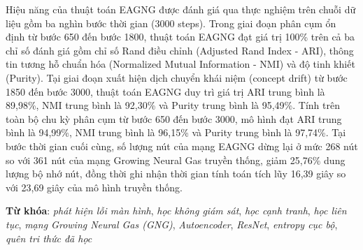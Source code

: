 \begin{small}
Hiệu năng của thuật toán EAGNG được đánh giá qua thực nghiệm trên chuỗi dữ liệu gồm ba nghìn bước thời gian (3000 steps). Trong giai đoạn phân cụm ổn định từ bước 650 đến bước 1800, thuật toán EAGNG đạt giá trị 100\% trên cả ba chỉ số đánh giá gồm chỉ số Rand điều chỉnh (Adjusted Rand Index - ARI), thông tin tương hỗ chuẩn hóa (Normalized Mutual Information - NMI) và độ tinh khiết (Purity). Tại giai đoạn xuất hiện dịch chuyển khái niệm (concept drift) từ bước 1850 đến bước 3000, thuật toán EAGNG duy trì giá trị ARI trung bình là 89,98\%, NMI trung bình là 92,30\% và Purity trung bình là 95,49\%. Tính trên toàn bộ chu kỳ phân cụm từ bước 650 đến bước 3000, mô hình đạt ARI trung bình là 94,99\%, NMI trung bình là 96,15\% và Purity trung bình là 97,74\%. Tại bước thời gian cuối cùng, số lượng nút của mạng EAGNG dừng lại ở mức 268 nút so với 361 nút của mạng Growing Neural Gas truyền thống, giảm 25,76\% dung lượng bộ nhớ nút, đồng thời ghi nhận thời gian tính toán tích lũy 16,39 giây so với 23,69 giây của mô hình truyền thống.


\vspace*{1cm}
\textbf{Từ khóa}: \textit{phát hiện lỗi màn hình}, \textit{học không giám sát}, \textit{học cạnh tranh}, \textit{học liên tục}, \textit{mạng Growing Neural Gas (GNG)}, \textit{Autoencoder}, \textit{ResNet}, \textit{entropy cục bộ}, \textit{quên tri thức đã học}

\end{small}